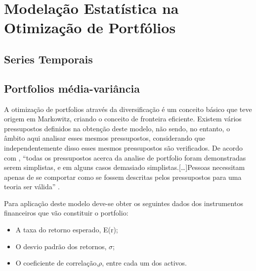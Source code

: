 \documentclass[
  12pt,
  a4paper,
  openany]{book}
\providecommand{\tightlist}{%
  \setlength{\itemsep}{0pt}\setlength{\parskip}{0pt}}
\begin{document}
\begingroup
\titleformat{\chapter}[display]
{\normalfont\huge\bfseries\centering}{\chaptertitlename\ \thechapter}{20pt}{\Huge}

\hypertarget{modelauxe7uxe3o-estatuxedstica-na-otimizauxe7uxe3o-de-portfuxf3lios}{%
\chapter{Modelação Estatística na Otimização de Portfólios}\label{modelauxe7uxe3o-estatuxedstica-na-otimizauxe7uxe3o-de-portfuxf3lios}}

\newpage

\hypertarget{series-temporais}{%
\section{Series Temporais}\label{series-temporais}}

\hypertarget{portfolios-muxe9dia-variuxe2ncia}{%
\section{Portfolios média-variância}\label{portfolios-muxe9dia-variuxe2ncia}}

A otimização de portfolios através da diversificação é um conceito básico que teve origem em Markowitz, criando o conceito de fronteira eficiente. Existem vários pressupostos definidos na obtenção deste modelo, não sendo, no entanto, o âmbito aqui analisar esses mesmos pressupostos, considerando que independentemente disso esses mesmos pressupostos são verificados. De acordo com \citet{Modern2013}, ``todas os pressupostos acerca da analise de portfolio foram demonstradas serem simplistas, e em alguns casos demasiado simplistas.{[}\ldots{]}Pessoas necessitam apenas de se comportar como se fossem descritas pelos pressupostos para uma teoria ser válida'' \citep[pp.5]{Modern2013}.

Para aplicação deste modelo deve-se obter os seguintes dados dos instrumentos financeiros que vão constituir o portfolio:

\begin{itemize}
\tightlist
\item
  A taxa do retorno esperado, E(r);
\item
  O desvio padrão dos retornos, \(\sigma\);
\item
  O coeficiente de correlação,\(\rho\), entre cada um dos activos.
\end{itemize}
\end{document}
